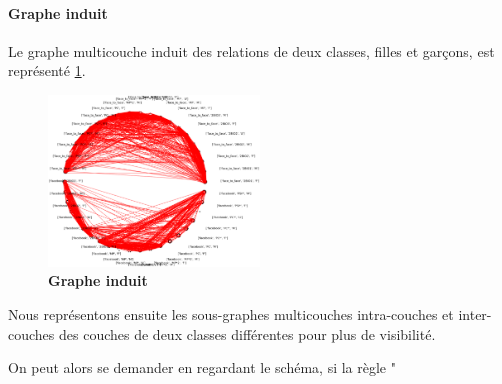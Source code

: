\documentclass[11pt,a4paper]{article}
\theoremstyle{definition}
\theoremstyle{remark}
\theoremstyle{remark}
\begin{document}
\paragraph{Graphe induit}
	Le graphe multicouche induit des relations de deux classes, filles et garçons, est représenté \cref{completinduit}.
	
\begin{figure}[h]
	\centering
	\includegraphics[width=0.5\textwidth]{tout.png}
	\caption{\textbf{Graphe induit}}
	\label{completinduit}
\end{figure}

	Nous représentons ensuite les sous-graphes multicouches intra-couches et inter-couches des couches de deux classes différentes pour plus de visibilité.


	
	On peut alors se demander en regardant le schéma, si la règle "
\end{document}
